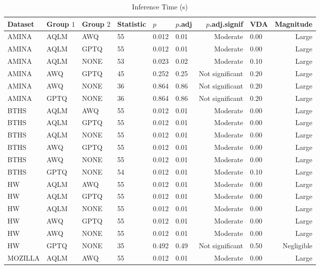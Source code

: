 \begin{table}[ht]
\centering
\tiny

\begin{subtable}[t]{0.48\textwidth}
    \caption{Inference Time (s)}
    \begin{tabular}{llllllrlr}
    \toprule
    Dataset & Group $1$ & Group $2$ & Statistic & $p$ & $p$.adj & $p$.adj.signif & VDA & Magnitude \\
    \midrule
    AMINA & AQLM & AWQ & 55 & 0.012 & 0.01 & Moderate & 0.00 & Large \\
    AMINA & AQLM & GPTQ & 55 & 0.012 & 0.01 & Moderate & 0.00 & Large \\
    AMINA & AQLM & NONE & 53 & 0.023 & 0.02 & Moderate & 0.10 & Large \\
    AMINA & AWQ & GPTQ & 45 & 0.252 & 0.25 & Not significant & 0.20 & Large \\
    AMINA & AWQ & NONE & 36 & 0.864 & 0.86 & Not significant & 0.20 & Large \\
    AMINA & GPTQ & NONE & 36 & 0.864 & 0.86 & Not significant & 0.20 & Large \\
    BTHS & AQLM & AWQ & 55 & 0.012 & 0.01 & Moderate & 0.00 & Large \\
    BTHS & AQLM & GPTQ & 55 & 0.012 & 0.01 & Moderate & 0.00 & Large \\
    BTHS & AQLM & NONE & 55 & 0.012 & 0.01 & Moderate & 0.00 & Large \\
    BTHS & AWQ & GPTQ & 55 & 0.012 & 0.01 & Moderate & 0.00 & Large \\
    BTHS & AWQ & NONE & 55 & 0.012 & 0.01 & Moderate & 0.00 & Large \\
    BTHS & GPTQ & NONE & 54 & 0.012 & 0.01 & Moderate & 0.10 & Large \\
    HW & AQLM & AWQ & 55 & 0.012 & 0.01 & Moderate & 0.00 & Large \\
    HW & AQLM & GPTQ & 55 & 0.012 & 0.01 & Moderate & 0.00 & Large \\
    HW & AQLM & NONE & 55 & 0.012 & 0.01 & Moderate & 0.00 & Large \\
    HW & AWQ & GPTQ & 55 & 0.012 & 0.01 & Moderate & 0.00 & Large \\
    HW & AWQ & NONE & 55 & 0.012 & 0.01 & Moderate & 0.00 & Large \\
    HW & GPTQ & NONE & 35 & 0.492 & 0.49 & Not significant & 0.50 & Negligible \\
    MOZILLA & AQLM & AWQ & 55 & 0.012 & 0.01 & Moderate & 0.00 & Large \\

\end{tabular}
\end{subtable}
\end{table}
